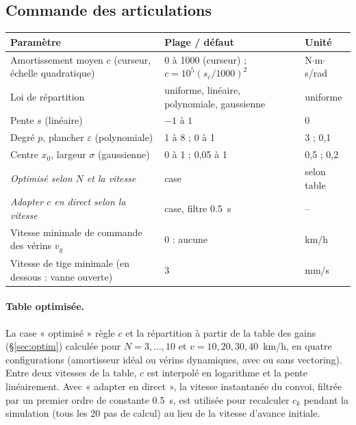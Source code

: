 \documentclass[11pt,a4paper]{article}
\begin{document}
\subsection{Commande des articulations}
\begin{center}\small
\begin{tabular}{@{}p{8cm}ll@{}}\toprule
Paramètre & Plage / défaut & Unité\\\midrule
Amortissement moyen $c$ (curseur, échelle quadratique) & 0 à 1000 (curseur) ; $c=10^{5}(s_c/1000)^2$ & N$\cdot$m$\cdot$s/rad\\
Loi de répartition & uniforme, linéaire, polynomiale, gaussienne & uniforme\\
Pente $s$ (linéaire) & $-1$ à $1$ & 0\\
Degré $p$, plancher $\varepsilon$ (polynomiale) & 1 à 8 ; 0 à 1 & 3 ; 0,1\\
Centre $x_0$, largeur $\sigma$ (gaussienne) & 0 à 1 ; 0,05 à 1 & 0,5 ; 0,2\\
\emph{Optimisé selon $N$ et la vitesse} & case & selon table\\
\emph{Adapter $c$ en direct selon la vitesse} & case, filtre \SI{0,5}{s} & --\\
Vitesse minimale de commande des vérins $v_g$ & 0 : aucune & km/h\\
Vitesse de tige minimale (en dessous : vanne ouverte) & 3 & mm/s\\\bottomrule
\end{tabular}
\end{center}

\paragraph{Table optimisée.} La case « optimisé » règle $c$ et la répartition à partir de la table des gains (§\ref{sec:optim}) calculée pour $N=3,\dots,10$ et $v=10,20,30,40$~km/h, en quatre configurations (amortisseur idéal ou vérins dynamiques, avec ou sans vectoring). Entre deux vitesses de la table, $c$ est interpolé en logarithme et la pente linéairement. Avec « adapter en direct », la vitesse instantanée du convoi, filtrée par un premier ordre de constante \SI{0,5}{s}, est utilisée pour recalculer $c_k$ pendant la simulation (tous les 20 pas de calcul) au lieu de la vitesse d'avance initiale.
\end{document}
